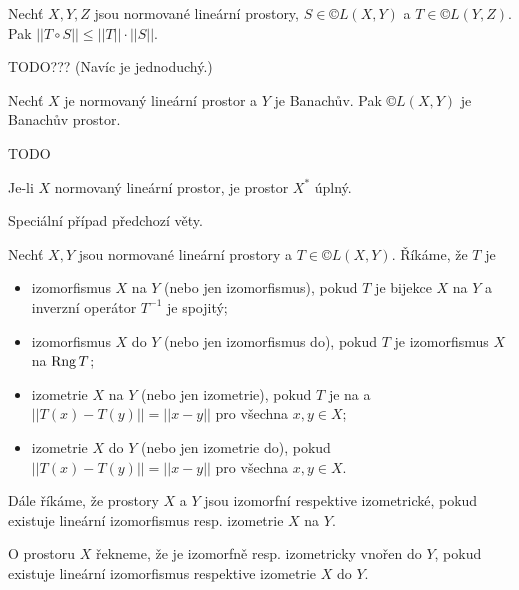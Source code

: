 \documentclass[12pt]{article}					%
\begin{document}
\begin{poznamka}[Fakt]
	Nechť $X, Y, Z$ jsou normované lineární prostory, $S \in ©L(X, Y)$ a $T \in ©L(Y, Z)$. Pak $||T \circ S|| ≤ ||T||·||S||$.

	\begin{dukazin}
		TODO??? (Navíc je jednoduchý.)
	\end{dukazin}
\end{poznamka}

\begin{veta}
	Nechť $X$ je normovaný lineární prostor a $Y$ je Banachův. Pak $©L(X, Y)$ je Banachův prostor.

	\begin{dukazin}
		TODO
	\end{dukazin}
\end{veta}

\begin{veta}
	Je-li $X$ normovaný lineární prostor, je prostor $X^*$ úplný.

	\begin{dukazin}
		Speciální případ předchozí věty.
	\end{dukazin}
\end{veta}

\begin{definice}
	Nechť $X, Y$ jsou normované lineární prostory a $T \in ©L(X, Y)$. Říkáme, že $T$ je
	
	\begin{itemize}
		\item izomorfismus $X$ na $Y$ (nebo jen izomorfismus), pokud $T$ je bijekce $X$ na $Y$ a inverzní operátor $T^{-1}$ je spojitý;
		\item izomorfismus $X$ do $Y$ (nebo jen izomorfismus do), pokud $T$ je izomorfismus $X$ na $\operatorname{Rng} T$;
		\item izometrie $X$ na $Y$ (nebo jen izometrie), pokud $T$ je na a $||T(x) - T(y)|| = ||x - y||$ pro všechna $x, y \in X$;
		\item izometrie $X$ do $Y$ (nebo jen izometrie do), pokud $||T(x) - T(y)|| = ||x - y||$ pro všechna $x, y \in X$.
	\end{itemize}

	Dále říkáme, že prostory $X$ a $Y$ jsou izomorfní respektive izometrické, pokud existuje lineární izomorfismus resp. izometrie $X$ na $Y$.

	O prostoru $X$ řekneme, že je izomorfně resp. izometricky vnořen do $Y$, pokud existuje lineární izomorfismus respektive izometrie $X$ do $Y$.
\end{definice}
\end{document}
